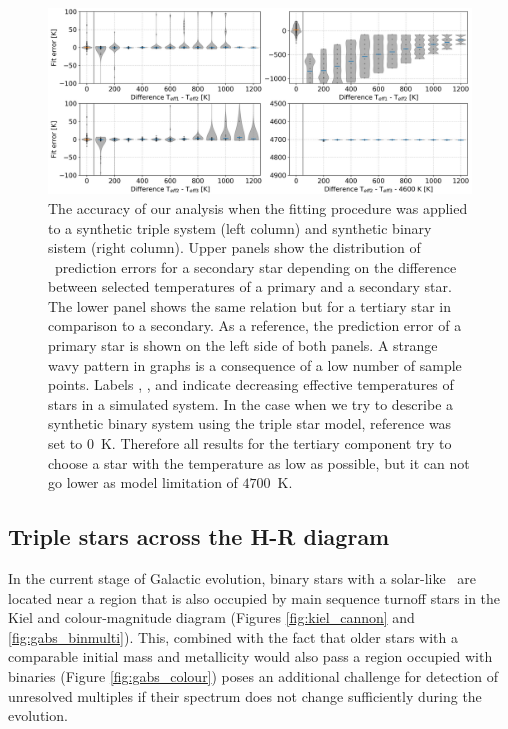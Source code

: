 \begin{figure}
	\centering
	\includegraphics[width=\textwidth]{three_stars_fit_sim_res_comb.png}
	\caption{The accuracy of our analysis when the fitting procedure was applied to a synthetic triple system (left column) and synthetic binary sistem (right column). Upper panels show the distribution of \Teff\ prediction errors for a secondary star depending on the difference between selected temperatures of a primary and a secondary star. The lower panel shows the same relation but for a tertiary star in comparison to a secondary. As a reference, the prediction error of a primary star is shown on the left side of both panels. A strange wavy pattern in graphs is a consequence of a low number of sample points. Labels , , and  indicate decreasing effective temperatures of stars in a simulated system. In the case when we try to describe a synthetic binary system using the triple star model, reference  was set to $0$~K. Therefore all results for the tertiary component try to choose a star with the temperature as low as possible, but it can not go lower as model limitation of $4700$~K.}
	\label{fig:triple_sym_res}
\end{figure}

\subsection{Triple stars across the H-R diagram}
In the current stage of Galactic evolution, binary stars with a solar-like \Teff\ are located near a region that is also occupied by main sequence turnoff stars in the Kiel and colour-magnitude diagram (Figures \ref{fig:kiel_cannon} and \ref{fig:gabs_binmulti}). This, combined with the fact that older stars with a comparable initial mass and metallicity would also pass a region occupied with binaries (Figure \ref{fig:gabs_colour}) poses an additional challenge for detection of unresolved multiples if their spectrum does not change sufficiently during the evolution.


